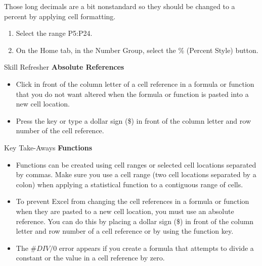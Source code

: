 Those long decimals are a bit nonstandard so they should be changed to a percent by applying cell formatting.

\begin{enumerate}
	\item Select the range \textsf{P5:P24}.
	\item On the Home tab, in the Number Group, select the \% (Percent Style) button.
\end{enumerate}

\begin{center}
	\begin{sklbox}{Skill Refresher}
		\textbf{Absolute References}
		\\
		\begin{itemize}
			\setlength{\itemsep}{0pt}
			\setlength{\parskip}{0pt}
			\setlength{\parsep}{0pt}

			\item Click in front of the column letter of a cell reference in a formula or function that you do not want altered when the formula or function is pasted into a new cell location.
			\item Press the  key or type a dollar sign (\$) in front of the column letter and row number of the cell reference.
						
		\end{itemize}
	\end{sklbox}
\end{center}

\begin{center}
	\begin{tkwbox}{Key Take-Aways}
		\textbf{Functions}
		\\
		\begin{itemize}
			\setlength{\itemsep}{0pt}
			\setlength{\parskip}{0pt}
			\setlength{\parsep}{0pt}

			\item Functions can be created using cell ranges or selected cell locations separated by commas. Make sure you use a cell range (two cell locations separated by a colon) when applying a statistical function to a contiguous range of cells.
			\item To prevent Excel from changing the cell references in a formula or function when they are pasted to a new cell location, you must use an absolute reference. You can do this by placing a dollar sign (\$) in front of the column letter and row number of a cell reference or by using the  function key.
			\item The $ \#DIV/0 $ error appears if you create a formula that attempts to divide a constant or the value in a cell reference by zero.
			
		\end{itemize}
	\end{tkwbox}
\end{center}

